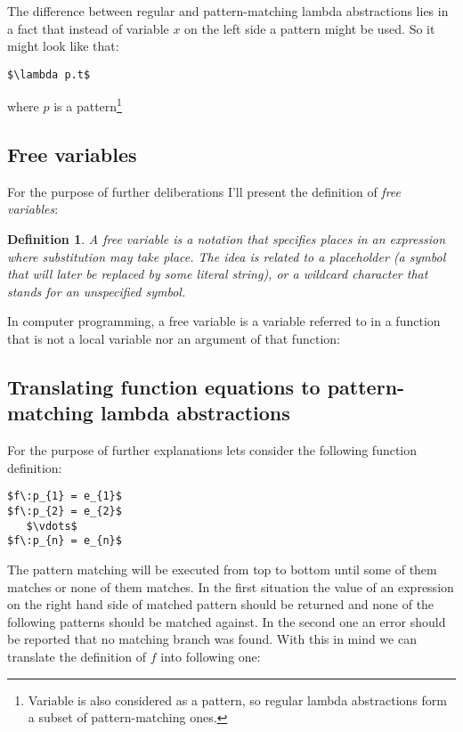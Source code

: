 \documentclass[a4paper]{report}
\newtheorem{definition}{Definition}[chapter]
\begin{document}
The difference between regular and pattern-matching lambda abstractions lies in
a fact that instead of variable $x$ on the left side a pattern might be
used. So it might look like that:
\begin{lstlisting}[mathescape=true]
$\lambda p.t$
\end{lstlisting}
where $p$ is a pattern\footnote{Variable is also considered as a
pattern, so regular lambda abstractions form a subset of pattern-matching ones.}

\subsection{Free variables}
\label{sec:free_variable}

For the purpose of further deliberations I'll present the definition of
\textit{free variables}:
\begin{definition}
  \label{def:free_variable}
  A free variable is a notation that specifies places in an expression where
  substitution may take place. The idea is related to a placeholder (a symbol
  that will later be replaced by some literal string), or a wildcard character
  that stands for an unspecified symbol.
\end{definition}

In computer programming, a free variable is a variable referred to in a
function that is not a local variable nor an argument of that function:

\subsection{Translating function equations to pattern-matching lambda
abstractions}
For the purpose of further explanations lets consider the following function
definition:

\begin{lstlisting}[mathescape=true]
$f\:p_{1} = e_{1}$
$f\:p_{2} = e_{2}$
   $\vdots$
$f\:p_{n} = e_{n}$
\end{lstlisting}

The pattern matching will be executed from top to bottom until some of them
matches or none of them matches. In the first situation the value of an
expression on the right hand side of matched pattern should be returned and
none of the following patterns should be matched against. In the second one an
error should be reported that no matching branch was found. With this in mind
we can translate the definition of $f$ into following one:
\end{document}
